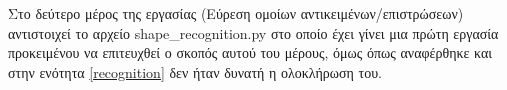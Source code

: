 \documentclass{article}
\begin{document}
Στο δεύτερο μέρος της εργασίας (Εύρεση ομοίων αντικειμένων/επιστρώσεων)
αντιστοιχεί το αρχείο shape\_recognition.py στο οποίο έχει γίνει μια
πρώτη εργασία προκειμένου να επιτευχθεί ο σκοπός αυτού του μέρους, όμως
όπως αναφέρθηκε και στην ενότητα \ref{recognition} δεν ήταν δυνατή η
ολοκλήρωση του.

\nocite{*}
\printbibliography[
	heading=bibintoc,
	title={References}
]
\end{document}
